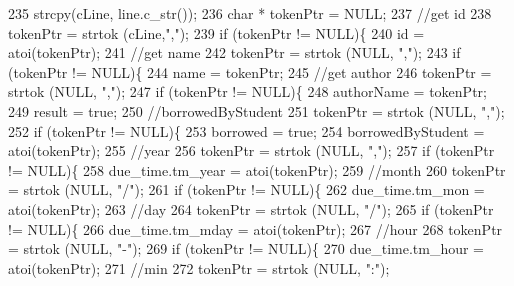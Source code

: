 \begin{DoxyCode}
235 \textcolor{comment}{    strcpy(cLine, line.c\_str());}
236 \textcolor{comment}{    char * tokenPtr = NULL;}
237 \textcolor{comment}{    //get id}
238 \textcolor{comment}{    tokenPtr = strtok (cLine,",");}
239 \textcolor{comment}{    if (tokenPtr != NULL)\{}
240 \textcolor{comment}{        id = atoi(tokenPtr);}
241 \textcolor{comment}{        //get name}
242 \textcolor{comment}{        tokenPtr = strtok (NULL, ",");}
243 \textcolor{comment}{        if (tokenPtr != NULL)\{}
244 \textcolor{comment}{            name = tokenPtr;}
245 \textcolor{comment}{            //get author}
246 \textcolor{comment}{            tokenPtr = strtok (NULL, ",");}
247 \textcolor{comment}{            if (tokenPtr != NULL)\{}
248 \textcolor{comment}{                authorName = tokenPtr;}
249 \textcolor{comment}{                result = true;}
250 \textcolor{comment}{                //borrowedByStudent}
251 \textcolor{comment}{                tokenPtr = strtok (NULL, ",");}
252 \textcolor{comment}{                    if (tokenPtr != NULL)\{}
253 \textcolor{comment}{                        borrowed = true;}
254 \textcolor{comment}{                        borrowedByStudent = atoi(tokenPtr);}
255 \textcolor{comment}{                        //year}
256 \textcolor{comment}{                        tokenPtr = strtok (NULL, ",");}
257 \textcolor{comment}{                        if (tokenPtr != NULL)\{}
258 \textcolor{comment}{                            due\_time.tm\_year = atoi(tokenPtr);}
259 \textcolor{comment}{                            //month}
260 \textcolor{comment}{                            tokenPtr = strtok (NULL, "/");}
261 \textcolor{comment}{                            if (tokenPtr != NULL)\{}
262 \textcolor{comment}{                                due\_time.tm\_mon = atoi(tokenPtr);}
263 \textcolor{comment}{                                //day}
264 \textcolor{comment}{                                tokenPtr = strtok (NULL, "/");}
265 \textcolor{comment}{                                if (tokenPtr != NULL)\{}
266 \textcolor{comment}{                                    due\_time.tm\_mday = atoi(tokenPtr);}
267 \textcolor{comment}{                                    //hour}
268 \textcolor{comment}{                                    tokenPtr = strtok (NULL, "-");}
269 \textcolor{comment}{                                    if (tokenPtr != NULL)\{}
270 \textcolor{comment}{                                        due\_time.tm\_hour = atoi(tokenPtr);}
271 \textcolor{comment}{                                        //min}
272 \textcolor{comment}{                                        tokenPtr = strtok (NULL, ":");}

\end{DoxyCode}
